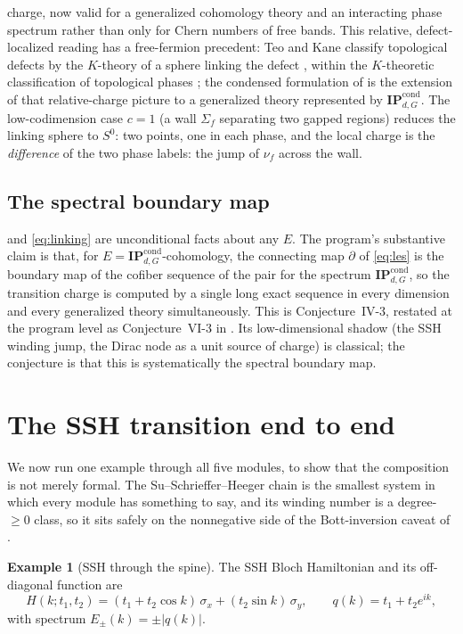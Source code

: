 \documentclass[12pt]{article}
\newcommand{\IPcond}{\mathbf{IP}^{\mathrm{cond}}}  %
\newcommand{\Sig}{\Sigma}                       %
\newcommand{\abs}[1]{\lvert #1 \rvert}
\theoremstyle{plain}
\theoremstyle{definition}
\newtheorem{example}[example]{Example}
\theoremstyle{remark}
\begin{document}
charge, now valid for a generalized cohomology theory and an interacting phase spectrum
rather than only for Chern numbers of free bands. This relative, defect-localized reading
has a free-fermion precedent: Teo and Kane classify topological defects by the $K$-theory of
a sphere linking the defect \cite{teo-kane}, within the $K$-theoretic classification of
topological phases \cite{thiang-ktheory}; the condensed formulation of
 is the extension of that relative-charge picture to a generalized
theory represented by $\IPcond_{d,G}$. The low-codimension case $c=1$ (a wall
$\Sig_f$ separating two gapped regions) reduces the linking sphere to $S^0$: two points,
one in each phase, and the local charge is the \emph{difference} of the two phase
labels: the jump of $\nu_f$ across the wall.

\subsection{The spectral boundary map}
\label{sec:boundary}

 and \eqref{eq:linking} are unconditional facts about any
$E$. The program's substantive claim is that, for $E=\IPcond_{d,G}$-cohomology, the
connecting map $\partial$ of \eqref{eq:les} is the boundary map of the cofiber sequence
of the pair for the spectrum $\IPcond_{d,G}$, so the transition charge is computed by a
single long exact sequence in every dimension and every generalized theory
simultaneously. This is Conjecture~IV-3, restated at the program level as
Conjecture~VI-3 in . Its low-dimensional shadow (the SSH winding
jump, the Dirac node as a unit source of charge) is classical; the conjecture is that
this is systematically the spectral boundary map.

\section{The SSH transition end to end}
\label{sec:ssh}

We now run one example through all five modules, to show that the composition is not
merely formal. The Su--Schrieffer--Heeger chain \cite{ssh-1979} is the smallest system in
which every module has something to say, and its winding number is a degree-$\ge0$ class,
so it sits safely on the nonnegative side of the Bott-inversion caveat of .

\begin{example}[SSH through the spine]
\label{ex:ssh}
The SSH Bloch Hamiltonian and its off-diagonal function are
\[
H(k;t_1,t_2)=(t_1+t_2\cos k)\,\sigma_x+(t_2\sin k)\,\sigma_y,
\qquad q(k)=t_1+t_2 e^{ik},
\]
with spectrum $E_\pm(k)=\pm\abs{q(k)}$.
\end{example}
\end{document}
